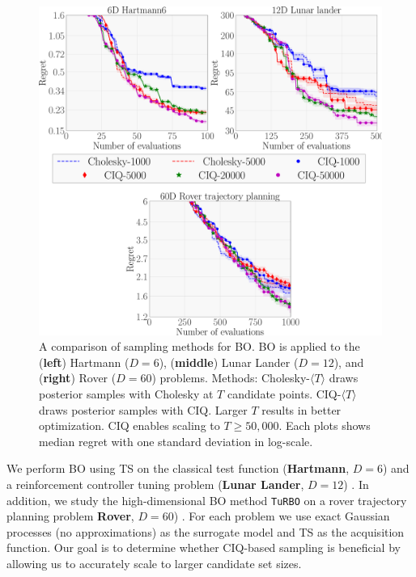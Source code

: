 \begin{figure}[t!]
  \centering
  \includegraphics[width=0.85\linewidth]{figures/bo_ciq.pdf}
  \caption[
    A comparison between CIQ and Cholesky sampling for Bayesian optimization (BO) via TS and \texttt{TuRBO}.
  ]{
    A comparison of sampling methods for BO.
    BO is applied to the ({\bf left}) Hartmann ($D=6$), ({\bf middle}) Lunar Lander ($D=12$), and ({\bf right}) Rover ($D=60$) problems.
    Methods: Cholesky-$\langle T \rangle$ draws posterior samples with Cholesky at $T$ candidate points.
    CIQ-$\langle T \rangle$ draws posterior samples with CIQ.
    Larger $T$ results in better optimization.
    CIQ enables scaling to $T\geq50,\!000$.
    Each plots shows median regret with one standard deviation in log-scale.
  }
  \label{fig:bayesopt}
\end{figure}

We perform BO using TS on the classical test function ({\bf Hartmann}, $D=6$) and a reinforcement controller tuning problem ({\bf Lunar Lander}, $D=12$) \cite{eriksson2019scalable}.
In addition, we study the high-dimensional BO method \texttt{TuRBO} \cite{eriksson2019scalable} on a rover trajectory planning problem {\bf Rover}, $D=60$) \cite{wang2017batched}.
For each problem we use exact Gaussian processes (no approximations) as the surrogate model and TS as the acquisition function.
Our goal is to determine whether CIQ-based sampling is beneficial by allowing us to accurately scale to larger candidate set sizes.

